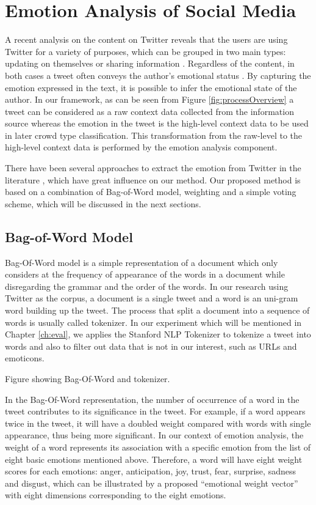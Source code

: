 \section{Emotion Analysis of Social Media}

A recent analysis on the content on Twitter reveals that the users are using Twitter for a variety of purposes, which can be grouped in two main types: updating on themselves or sharing information \citep{java2007we}. Regardless of the content, in both cases a tweet often conveys the author's emotional status \citep{bollen2009modeling}. By capturing the emotion expressed in the text, it is possible to infer the emotional state of the author. In our framework, as can be seen from Figure \ref{fig:processOverview} a tweet can be considered as a raw context data collected from the information source whereas the emotion in the tweet is the high-level context data to be used in later crowd type classification. This transformation from the raw-level to the high-level context data is performed by the emotion analysis component.

There have been several approaches to extract the emotion from Twitter in the literature \citep{roberts2012empatweet, bollen2009modeling, mohammad2012emotional, mohammad2014using}, which have great influence on our method. Our proposed method is based on a combination of Bag-of-Word model, weighting and a simple voting scheme, which will be discussed in the next sections.

\subsection{Bag-of-Word Model}
Bag-Of-Word model is a simple representation of a document which only considers at the frequency of appearance of the words in a document while disregarding the grammar and the order of the words. In our research using Twitter as the corpus, a document is a single tweet and a word is an uni-gram word building up the tweet. The process that split a document into a sequence of words is usually called tokenizer. In our experiment which will be mentioned in Chapter \ref{ch:eval}, we applies the Stanford NLP Tokenizer to tokenize a tweet into words and also to filter out data that is not in our interest, such as URLs and emoticons. 

Figure showing Bag-Of-Word and tokenizer.

In the Bag-Of-Word representation, the number of occurrence of a word in the tweet contributes to its significance in the tweet. For example, if a word appears twice in the tweet, it will have a doubled weight compared with words with single appearance, thus being more significant. In our context of emotion analysis, the weight of a word represents its association with a specific emotion from the list of eight basic emotions mentioned above. Therefore, a word will have eight weight scores for each emotions: anger, anticipation, joy, trust, fear, surprise, sadness and disgust, which can be illustrated by a proposed ``emotional weight vector'' with eight dimensions corresponding to the eight emotions. 

